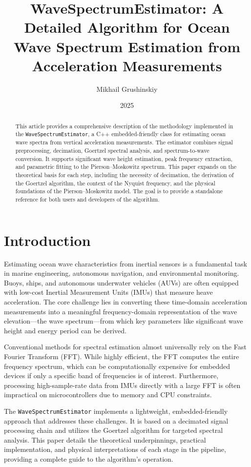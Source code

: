 \documentclass[11pt,letterpaper]{article}
\title{WaveSpectrumEstimator: A Detailed Algorithm for Ocean Wave Spectrum Estimation from Acceleration Measurements}
\author{Mikhail Grushinskiy}
\date{2025}
\begin{document}
\maketitle

\begin{abstract}
This article provides a comprehensive description of the methodology implemented in the \texttt{WaveSpectrumEstimator}, a C++ embedded-friendly class for estimating ocean wave spectra from vertical acceleration measurements. The estimator combines signal preprocessing, decimation, Goertzel spectral analysis, and spectrum-to-wave conversion. It supports significant wave height estimation, peak frequency extraction, and parametric fitting to the Pierson--Moskowitz spectrum. This paper expands on the theoretical basis for each step, including the necessity of decimation, the derivation of the Goertzel algorithm, the context of the Nyquist frequency, and the physical foundations of the Pierson--Moskowitz model. The goal is to provide a standalone reference for both users and developers of the algorithm.
\end{abstract}

\tableofcontents

\section{Introduction}
\label{sec:intro}
Estimating ocean wave characteristics from inertial sensors is a fundamental task in marine engineering, autonomous navigation, and environmental monitoring. Buoys, ships, and autonomous underwater vehicles (AUVs) are often equipped with low-cost Inertial Measurement Units (IMUs) that measure heave acceleration. The core challenge lies in converting these time-domain acceleration measurements into a meaningful frequency-domain representation of the wave elevation—the wave spectrum—from which key parameters like significant wave height and energy period can be derived.

Conventional methods for spectral estimation almost universally rely on the Fast Fourier Transform (FFT). While highly efficient, the FFT computes the entire frequency spectrum, which can be computationally expensive for embedded devices if only a specific band of frequencies is of interest. Furthermore, processing high-sample-rate data from IMUs directly with a large FFT is often impractical on microcontrollers due to memory and CPU constraints.

The \texttt{WaveSpectrumEstimator} implements a lightweight, embedded-friendly approach that addresses these challenges. It is based on a decimated signal processing chain and utilizes the Goertzel algorithm for targeted spectral analysis. This paper details the theoretical underpinnings, practical implementation, and physical interpretations of each stage in the pipeline, providing a complete guide to the algorithm's operation.
\end{document}
